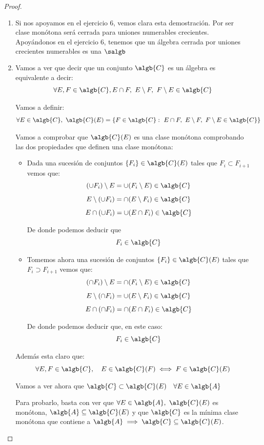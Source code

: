 \begin{problem}[14]
\begin{proof}
\begin{enumerate}
\item Si nos apoyamos en el ejercicio 6, vemos clara esta demostración. Por ser clase monótona será cerrada para uniones numerables crecientes. Apoyándonos en el ejercicio 6, tenemos que un álgebra cerrada por uniones crecientes numerables es una $\salgb$

\item Vamos a ver que decir que un conjunto $\algb{C}$ es un álgebra es equivalente a decir:
\[\forall E,F \in \algb{C}, E\cap F, \ E\setminus F, \ F\setminus E \in \algb{C}\]

Vamos a definir:
\[\forall E \in \algb{C}, \ \algb{C}(E)=\{F \in \algb{C}: \  E\cap F, \ E\setminus F, \ F\setminus E \in \algb{C}\} \]

Vamos a comprobar que $\algb{C}(E)$ es una clase monótona comprobando las dos propiedades que definen una clase monótona:
\begin{itemize}
\item Dada una sucesión de conjuntos $\{F_i\} \in \algb{C}(E)$ tales que $F_i \subset F_{i+1}$ vemos que:
\ppart \[(\cup F_i)\setminus E = \cup (F_i \setminus E) \in \algb{C}\]
\ppart \[E \setminus (\cup F_i) = \cap(E \setminus F_i) \in \algb{C}\]
\ppart \[E \cap (\cup F_i) = \cup (E \cap F_i) \in \algb{C}\]

De donde podemos deducir que
\[F_i \in \algb{C}\]

\item Tomemos ahora una sucesión de conjuntos $\{F_i\}\in \algb{C}(E)$ tales que $F_i \supset F_{i+1}$ vemos que:
\ppart \[(\cap F_i)\setminus E = \cap (F_i \setminus E) \in \algb{C}\]
\ppart \[E \setminus (\cap F_i) = \cup(E\setminus F_i) \in \algb{C}\]
\ppart \[E \cap (\cap F_i) = \cap (E \cap F_i)\in \algb{C}\]

De donde podemos deducir que, en este caso:
\[F_i \in \algb{C}\]
\end{itemize}

Además esta claro que:
\[\forall E,F \in \algb{C}, \quad E\in \algb{C}(F) \iff F \in \algb{C}(E)\]

Vamos a ver ahora que $\algb{C} \subset \algb{C}(E) \quad \forall E \in \algb{A}$

Para probarlo, basta con ver que $\forall E \in \algb{A}, \ \algb{C}(E)$ es monótona, $\algb{A} \subseteq \algb{C}(E)$ y que $\algb{C}$ es la mínima clase monótona que contiene a $\algb{A} \implies \algb{C} \subseteq \algb{C}(E) $.

\end{enumerate}
\end{proof}
\end{problem}

